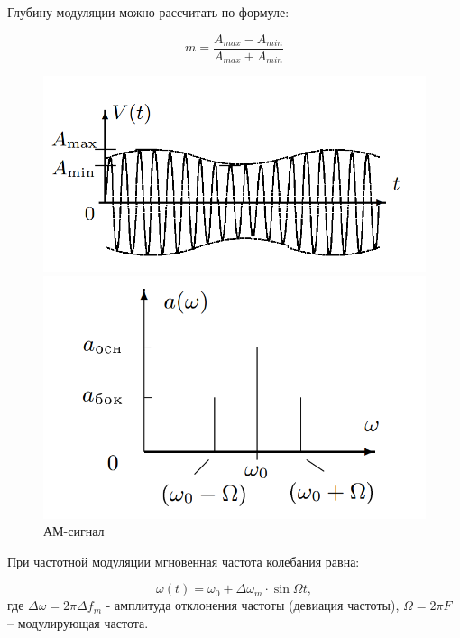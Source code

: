 \documentclass[12pt,a4paper]{article}
\begin{document}
Глубину модуляции можно рассчитать по формуле:

\begin{equation}
	m = \frac{A_{max}-A_{min}}{A_{max}+A_{min}}
	\label{eq:m}
\end{equation}

\begin{figure}[h]
	\begin{minipage}{0.49\linewidth}
		\centering
		\includegraphics[width=0.9\linewidth]{"res/AM"}
	\end{minipage}
	\begin{minipage}{0.49\linewidth}
		\centering
		\includegraphics[width=0.9\linewidth]{"res/spAM"}
	\end{minipage}
	\caption{АМ-сигнал}
	\label{fig:AM}
\end{figure}

При частотной модуляции мгновенная частота колебания равна:

\begin{equation}\label{m}
	\omega(t) = \omega_0+\Delta \omega_m \cdot \sin \Omega t,
\end{equation}
где $\Delta \omega = 2\pi \Delta f_m$ - амплитуда отклонения частоты (девиация частоты),
$\Omega = 2\pi F$ – модулирующая частота.
\end{document}

